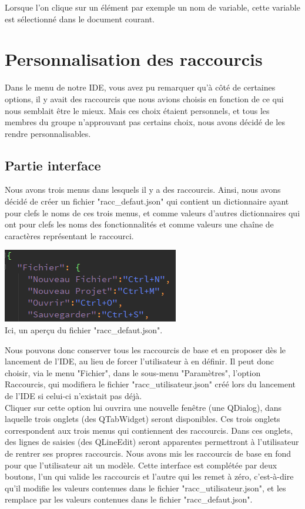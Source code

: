 \documentclass[a4paper,12pt]{article}
\begin{document}
	Lorsque l'on clique sur un élément par exemple un nom de variable, cette variable est sélectionné dans le document courant.

\section{Personnalisation des raccourcis}

	Dans le menu de notre IDE, vous avez pu remarquer qu'à côté de certaines options, il y avait des raccourcis que nous avions choisis en fonction de ce qui nous semblait être le mieux. Mais ces choix étaient personnels, et tous les membres du groupe n'approuvant pas certains choix, nous avons décidé de les rendre personnalisables.

	\subsection{Partie interface}

	Nous avons trois menus dans lesquels il y a des raccourcis. Ainsi, nous avons décidé de créer un fichier "racc\_defaut.json" qui contient un dictionnaire ayant pour clefs le noms de ces trois menus, et comme valeurs d'autres dictionnaires qui ont pour clefs les noms des fonctionnalités et comme valeurs une chaîne de caractères représentant le raccourci.

\begin{center}
	\includegraphics[scale=0.5]{images/imgs_racc/ex_1.png}\\
	Ici, un aperçu du fichier "racc\_defaut.json".
\end{center}

	Nous pouvons donc conserver tous les raccourcis de base et en proposer dès le lancement de l'IDE, au lieu de forcer l'utilisateur à en définir. Il peut donc choisir, via le menu "Fichier", dans le sous-menu "Paramètres", l'option Raccourcis, qui modifiera le fichier "racc\_utilisateur.json" créé lors du lancement de l'IDE si celui-ci n'existait pas déjà.\\

	Cliquer sur cette option lui ouvrira une nouvelle fenêtre (une QDialog), dans laquelle trois onglets (des QTabWidget) seront disponibles. Ces trois onglets correspondent aux trois menus qui contiennent des raccourcis. Dans ces onglets, des lignes de saisies (des QLineEdit) seront apparentes permettront à l'utilisateur de rentrer ses propres raccourcis. Nous avons mis les raccourcis de base en fond pour que l'utilisateur ait un modèle. Cette interface est complétée par deux boutons, l'un qui valide les raccourcis et l'autre qui les remet à zéro, c'est-à-dire qu'il modifie les valeurs contenues dans le fichier "racc\_utilisateur.json",  et les remplace par les valeurs contenues dans le fichier "racc\_defaut.json".
\end{document}
